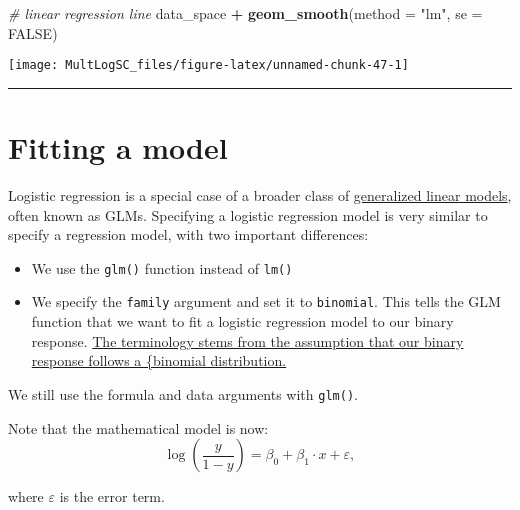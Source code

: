 \documentclass[
]{book}
\newenvironment{Shaded}{\begin{snugshade}}{\end{snugshade}}
\newcommand{\CommentTok}[1]{\textcolor[rgb]{0.56,0.35,0.01}{\textit{#1}}}
\newcommand{\DataTypeTok}[1]{\textcolor[rgb]{0.13,0.29,0.53}{#1}}
\newcommand{\KeywordTok}[1]{\textcolor[rgb]{0.13,0.29,0.53}{\textbf{#1}}}
\newcommand{\NormalTok}[1]{#1}
\newcommand{\OperatorTok}[1]{\textcolor[rgb]{0.81,0.36,0.00}{\textbf{#1}}}
\newcommand{\OtherTok}[1]{\textcolor[rgb]{0.56,0.35,0.01}{#1}}
\newcommand{\StringTok}[1]{\textcolor[rgb]{0.31,0.60,0.02}{#1}}
\begin{document}
\begin{Shaded}
\begin{Highlighting}[]
\CommentTok{# linear regression line}
\NormalTok{data_space }\OperatorTok{+}\StringTok{ }
\StringTok{  }\KeywordTok{geom_smooth}\NormalTok{(}\DataTypeTok{method =} \StringTok{"lm"}\NormalTok{, }\DataTypeTok{se =} \OtherTok{FALSE}\NormalTok{)}
\end{Highlighting}
\end{Shaded}

\begin{center}\texttt{[image: MultLogSC\_files/figure-latex/unnamed-chunk-47-1]} \end{center}

\begin{center}\rule{0.5\linewidth}{0.5pt}\end{center}

\hypertarget{fitting-a-model}{%
\section{Fitting a model}\label{fitting-a-model}}

Logistic regression is a special case of a broader class of \href{https://en.wikipedia.org/wiki/Generalized_linear_model}{generalized linear models}, often known as GLMs. Specifying a logistic regression model is very similar to specify a regression model, with two important differences:

\begin{itemize}
\item
  We use the \texttt{glm()} function instead of \texttt{lm()}
\item
  We specify the \texttt{family} argument and set it to \texttt{binomial}. This tells the GLM function that we want to fit a logistic regression model to our binary response. \href{https://en.wikipedia.org/wiki/Binomial_distribution}{The terminology stems from the assumption that our binary response follows a \{binomial distribution.}
\end{itemize}

We still use the formula and data arguments with \texttt{glm()}.

Note that the mathematical model is now:
\begin{equation}
\log\left(\frac{y}{1-y}\right) = \beta_0 + \beta_1 \cdot x + \varepsilon,
\end{equation}

where \(\varepsilon\) is the error term.
\end{document}
